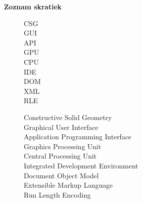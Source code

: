 \eject
\begin{Huge}
\noindent\textbf{Zoznam skratiek} 
\end{Huge}


\begin{figure}[!h]
		\bigskip
		\bigskip
		\hspace{0.5cm}
		\begin{minipage}[h]{0.1\textwidth}
		  CSG 	    \\
		  GUI			\\
		  API 	\\
		  GPU	\\
		  CPU \\ 
		  IDE \\
		  DOM \\
		  XML \\
		  RLE \\
		\end{minipage}
		\begin{minipage}[h]{0.5\textwidth}
		  Constructive Solid Geometry 	    \\
		  Graphical User Interface 	    \\
		  Application Programming Interface	    \\
		  Graphics Processing Unit	    \\
		  Central Processing Unit \\
		  Integrated Development Environment \\
		  Document Object Model \\
		  Extensible Markup Language \\
		  Run Length Encoding
		  \end{minipage}
	\end{figure}